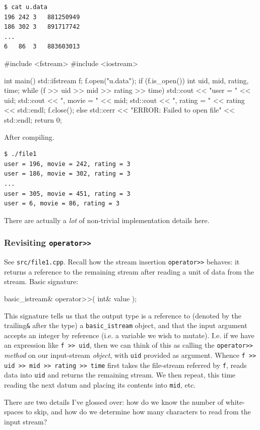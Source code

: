 \documentclass[12pt,letterpaper,twoside]{article}
\begin{document}
\begin{verbatim}
$ cat u.data
196 242 3   881250949
186 302 3   891717742
...
6   86  3   883603013
\end{verbatim}

\begin{cpp}
#include <fstream>
#include <iostream>

int main() {
  std::ifstream f;
  f.open("u.data");
  if (f.is_open()) {
    int uid, mid, rating, time;
    while (f >> uid >> mid >> rating >> time) {
      std::cout << "user = "     << uid;
      std::cout << ", movie = "  << mid;
      std::cout << ", rating = " << rating << std::endl;
    }
    f.close();
  }
  else {
    std::cerr << "ERROR: Failed to open file" << std::endl;
  }
  return 0;
}
\end{cpp}
After compiling.
\begin{verbatim}
$ ./file1
user = 196, movie = 242, rating = 3
user = 186, movie = 302, rating = 3
...
user = 305, movie = 451, rating = 3
user = 6, movie = 86, rating = 3
\end{verbatim}
There are actually a \emph{lot} of non-trivial implementation details here.

\subsubsection{Revisiting \texttt{operator>>}}
See \texttt{src/file1.cpp}. Recall 
how the stream insertion \texttt{operator>>} 
behaves: it returns a reference to the remaining stream after reading a unit of data 
from the stream. Basic signature:
\begin{cpp}
basic_istream& operator>>( int& value );
\end{cpp}
This signature tells us that the output type is a reference to (denoted by the trailing\texttt{\&} after the type) a \texttt{basic\_istream} object, and that the input argument 
accepts an integer by reference (i.e. a variable we wish to mutate).
I.e. if we have an expression like \texttt{f >> uid}, then we can think of this as
calling the \texttt{operator>>} \emph{method} on our input-stream \emph{object}, with 
\texttt{uid} provided as argument.
Whence \texttt{f >> uid >> mid >> rating >> time} first takes the 
file-stream referred by 
\texttt{f}, reads data into \texttt{uid} and returns the remaining stream. 
We then repeat, this time reading the next datum and placing its contents into \texttt{mid}, etc. 

There are two details I've glossed over: how do we know the number of white-spaces to skip,
and how do we determine how many characters to read from the input stream?
\end{document}
